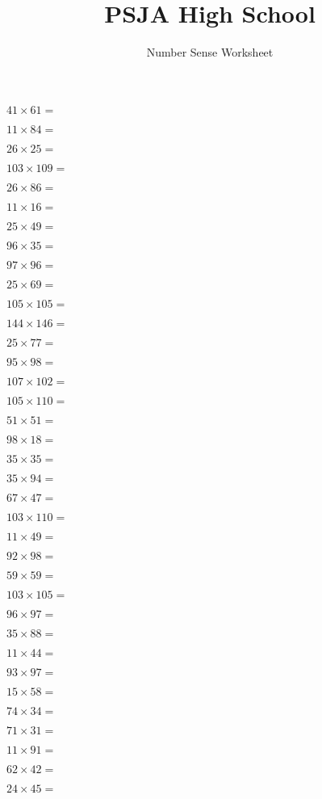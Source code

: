 \documentclass{numbersense}
\title{PSJA High School}
\subtitle{Number Sense Worksheet}
\begin{document}
\begin{questions}
\q[2501] $41 \times 61 = $\ans

\q[924] $11 \times 84 = $\ans

\q[650] $26 \times 25 = $\ans

\q[11227] $103 \times 109 = $\ans

\q[2236] $26 \times 86 = $\ans

\q[176] $11 \times 16 = $\ans

\q[1225] $25 \times 49 = $\ans

\q[3360] $96 \times 35 = $\ans

\q[9312] $97 \times 96 = $\ans

\q[1725] $25 \times 69 = $\ans

\q[11025] $105 \times 105 = $\ans

\q[21024] $144 \times 146 = $\ans

\q[1925] $25 \times 77 = $\ans

\q[9310] $95 \times 98 = $\ans

\q[10914] $107 \times 102 = $\ans

\q[11550] $105 \times 110 = $\ans

\q[2601] $51 \times 51 = $\ans

\q[1764] $98 \times 18 = $\ans

\q[1225] $35 \times 35 = $\ans

\q[3290] $35 \times 94 = $\ans

\q[3149] $67 \times 47 = $\ans

\q[11330] $103 \times 110 = $\ans

\q[539] $11 \times 49 = $\ans

\q[9016] $92 \times 98 = $\ans

\q[3481] $59 \times 59 = $\ans

\q[10815] $103 \times 105 = $\ans

\q[9312] $96 \times 97 = $\ans

\q[3080] $35 \times 88 = $\ans

\q[484] $11 \times 44 = $\ans

\q[9021] $93 \times 97 = $\ans

\q[870] $15 \times 58 = $\ans

\q[2516] $74 \times 34 = $\ans

\q[2201] $71 \times 31 = $\ans

\q[1001] $11 \times 91 = $\ans

\q[2604] $62 \times 42 = $\ans

\q[1080] $24 \times 45 = $\ans


\end{questions}
\end{document}
